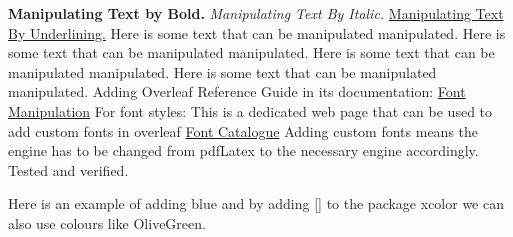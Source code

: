 \documentclass{report}
\theoremstyle{plain} %
\begin{document}
\textbf{Manipulating Text by Bold.}
\vspace{4mm}
\newline
\textit{Manipulating Text By Italic.}
\vspace{4mm}
\newline
\underline{Manipulating Text By Underlining.}
\vspace{4mm}
\newline
Here is some text that can be manipulated {\sffamily manipulated}.
\vspace{4mm}
\newline
Here is some text that can be manipulated {\ttfamily manipulated}.
\vspace{4mm}
\newline
{\small Here} is some text that can be manipulated {\ttfamily manipulated}.
\vspace{4mm}
\newline
{\huge Here} is some text that can be manipulated {\ttfamily manipulated}.
\vspace{4mm}
\newline
Adding Overleaf Reference Guide in its documentation: \href{https://www.overleaf.com/learn/latex/Font_typefaces}{ Font Manipulation}
\vspace{4mm}
\newline
For font styles: This is a dedicated web page that can be used to add custom fonts in overleaf 
\href{https://tug.org/FontCatalogue/}{Font Catalogue}
\vspace{4mm}
\newline
Adding custom fonts means the engine has to be changed from pdfLatex to the necessary engine accordingly.
Tested and verified.

\vspace{4mm}
\newline
Here is an example of adding {\color{blue} blue} and by adding [] to the package xcolor we can also use colours like {\color{OliveGreen} OliveGreen}.
\end{document}
